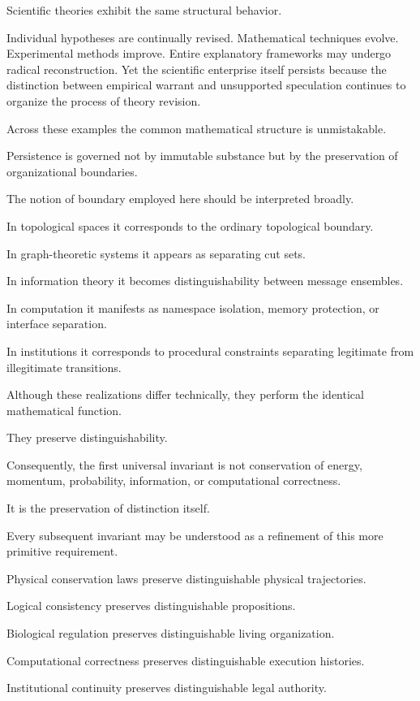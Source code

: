 \documentclass[11pt]{book}
\numberwithin{equation}{chapter}
\theoremstyle{definition}
\theoremstyle{plain}
\begin{document}
Scientific theories exhibit the same structural behavior.

Individual hypotheses are continually revised. Mathematical techniques evolve. Experimental methods improve. Entire explanatory frameworks may undergo radical reconstruction. Yet the scientific enterprise itself persists because the distinction between empirical warrant and unsupported speculation continues to organize the process of theory revision.

Across these examples the common mathematical structure is unmistakable.

Persistence is governed not by immutable substance but by the preservation of organizational boundaries.

The notion of boundary employed here should be interpreted broadly.

In topological spaces it corresponds to the ordinary topological boundary.

In graph-theoretic systems it appears as separating cut sets.

In information theory it becomes distinguishability between message ensembles.

In computation it manifests as namespace isolation, memory protection, or interface separation.

In institutions it corresponds to procedural constraints separating legitimate from illegitimate transitions.

Although these realizations differ technically, they perform the identical mathematical function.

They preserve distinguishability.

Consequently, the first universal invariant is not conservation of energy, momentum, probability, information, or computational correctness.

It is the preservation of distinction itself.

Every subsequent invariant may be understood as a refinement of this more primitive requirement.

Physical conservation laws preserve distinguishable physical trajectories.

Logical consistency preserves distinguishable propositions.

Biological regulation preserves distinguishable living organization.

Computational correctness preserves distinguishable execution histories.

Institutional continuity preserves distinguishable legal authority.
\end{document}

